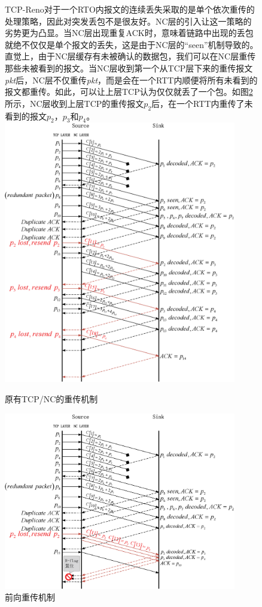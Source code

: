 \begin{figure}[htbp]TCP-Reno对于一个RTO内报文的连续丢失采取的是单个依次重传的处理策略，因此对突发丢包不是很友好。NC层的引入让这一策略的劣势更为凸显。当NC层出现重复ACK时，意味着链路中出现的丢包就绝不仅仅是单个报文的丢失，这是由于NC层的“seen”机制导致的。直觉上，由于NC层缓存有未被确认的数据包，我们可以在NC层重传那些未被看到的报文。当NC层收到第一个从TCP层下来的重传报文\emph{pkt}后，NC层不仅重传\emph{pkt}，而是会在一个RTT内顺便将所有未看到的报文都重传。如此，可以让上层TCP认为仅仅就丢了一个包。如图\ref{NEWFR_EPS}所示，NC层收到上层TCP的重传报文$p_2$后，在一个RTT内重传了未看到的报文$p_2$，$p_3$和$p_4$。
	\centering
	\includegraphics[width=4in]{figures/fr.eps}
	\caption{原有TCP/NC的重传机制}
	\label{FR_EPS}
\end{figure}
\begin{figure}
	\centering
	\includegraphics[width=4in]{figures/newfr.eps}
	\caption{前向重传机制}
	\label{NEWFR_EPS}
\end{figure}
